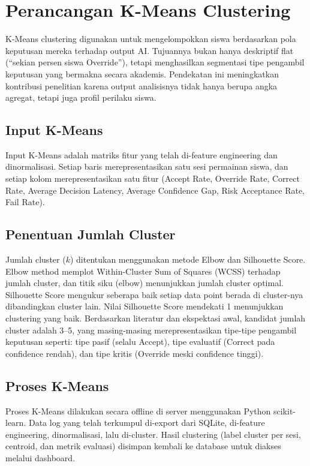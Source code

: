 \section{Perancangan K-Means Clustering}

K-Means clustering digunakan untuk mengelompokkan siswa berdasarkan pola keputusan mereka terhadap output AI. Tujuannya bukan hanya deskriptif flat (``sekian persen siswa Override''), tetapi menghasilkan segmentasi tipe pengambil keputusan yang bermakna secara akademis. Pendekatan ini meningkatkan kontribusi penelitian karena output analisisnya tidak hanya berupa angka agregat, tetapi juga profil perilaku siswa.

\subsection{Input K-Means}

Input K-Means adalah matriks fitur yang telah di-feature engineering dan dinormalisasi. Setiap baris merepresentasikan satu sesi permainan siswa, dan setiap kolom merepresentasikan satu fitur (Accept Rate, Override Rate, Correct Rate, Average Decision Latency, Average Confidence Gap, Risk Acceptance Rate, Fail Rate).

\subsection{Penentuan Jumlah Cluster}

Jumlah cluster ($k$) ditentukan menggunakan metode Elbow dan Silhouette Score. Elbow method memplot Within-Cluster Sum of Squares (WCSS) terhadap jumlah cluster, dan titik siku (elbow) menunjukkan jumlah cluster optimal. Silhouette Score mengukur seberapa baik setiap data point berada di cluster-nya dibandingkan cluster lain. Nilai Silhouette Score mendekati 1 menunjukkan clustering yang baik. Berdasarkan literatur dan ekspektasi awal, kandidat jumlah cluster adalah 3--5, yang masing-masing merepresentasikan tipe-tipe pengambil keputusan seperti: tipe pasif (selalu Accept), tipe evaluatif (Correct pada confidence rendah), dan tipe kritis (Override meski confidence tinggi).

\subsection{Proses K-Means}

Proses K-Means dilakukan secara offline di server menggunakan Python scikit-learn. Data log yang telah terkumpul di-export dari SQLite, di-feature engineering, dinormalisasi, lalu di-cluster. Hasil clustering (label cluster per sesi, centroid, dan metrik evaluasi) disimpan kembali ke database untuk diakses melalui dashboard.

